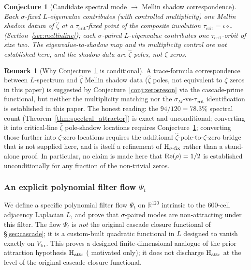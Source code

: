 \documentclass[11pt, a4paper]{amsart}
\newtheorem{conjecture}[theorem]{Conjecture}
\theoremstyle{definition}
\newtheorem{remark}[theorem]{Remark}
\newcommand{\R}{\mathbb{R}}
\begin{document}
\begin{conjecture}[Candidate spectral mode $\to$ Mellin shadow correspondence]\label{conj:spec_to_zero}
Each $\sigma$-fixed $L$-eigenvalue contributes (with controlled
multiplicity) one Mellin shadow datum of $\widehat\zeta$ at a
$\tau_{\mathrm{crit}}$-fixed point of the composite involution
$\tau_{\mathrm{crit}} = \iota \circ \bar{\ }$ (Section~\ref{sec:mellinline});
each $\sigma$-paired $L$-eigenvalue contributes one
$\tau_{\mathrm{crit}}$-orbit of size two.  The eigenvalue-to-shadow
map and its multiplicity control are not established here, and the
shadow data are $\widehat\zeta$ poles, not $\zeta$ zeros.
\end{conjecture}

\begin{remark}[Why Conjecture~\ref{conj:spec_to_zero} is conditional]\label{rmk:cond_spec_zero}
A trace-formula correspondence between $L$-spectrum and
$\widehat\zeta$ Mellin shadow data ($\widehat\zeta$ poles, not
equivalent to $\zeta$ zeros in this paper) is suggested by
Conjecture~\ref{conj:zerosreson} via the cascade-prime functional, but
neither the multiplicity matching nor the
$\sigma_M$-vs-$\tau_{\mathrm{crit}}$ identification is established in this paper.
The honest reading: the $94/120 = 78.3\%$ spectral count
(Theorem~\ref{thm:spectral_attractor}) is exact and unconditional;
converting it into critical-line $\widehat\zeta$ pole-shadow
locations requires Conjecture~\ref{conj:spec_to_zero}; converting
those further into $\zeta$-zero locations requires the additional
$\widehat\zeta$-pole-to-$\zeta$-zero bridge that is not supplied
here, and is itself a refinement of $\textup{H}_{\sigma\text{-fix}}$
rather than a stand-alone proof.  In particular, no claim is made here that
$\textup{Re}(\rho) = 1/2$ is established unconditionally for any
fraction of the non-trivial zeros.
\end{remark}

\subsubsection*{An explicit polynomial filter flow $\Psi_t$}

We define a specific polynomial filter flow $\Psi_t$ on $\R^{120}$
intrinsic to the 600-cell adjacency Laplacian $L$, and prove that
$\sigma$-paired modes are non-attracting under this filter. The
flow $\Psi_t$ is \emph{not} the original cascade closure functional
of \S\ref{sec:cascade}; it is a custom-built quadratic functional
in $L$ designed to vanish exactly on $V_{\mathrm{fix}}$. This proves
a designed finite-dimensional analogue of the prior attraction
hypothesis $\textup{H}_{\mathrm{attr}}$
(\cite{AdaptiveClosureTransport, TransportLaw} motivated only); it
does not discharge $\textup{H}_{\mathrm{attr}}$ at the level of the
original cascade closure functional.
\end{document}
